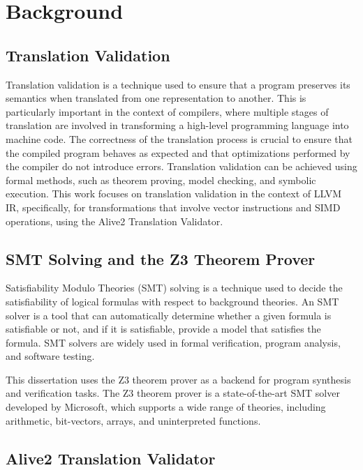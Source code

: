 \chapter{Background}
\label{chap:background}

\section {Translation Validation}

Translation validation is a technique used to ensure that a program
preserves its semantics when translated from one representation to
another.
%
This is particularly important in the context of compilers,
where multiple stages of translation are involved in transforming a
high-level programming language into machine code.
%
The correctness of the translation process is crucial to ensure that
the compiled program behaves as expected and that optimizations
performed by the compiler do not introduce errors.
%
Translation validation can be achieved using formal methods, such as
theorem proving, model checking, and symbolic execution.
%
This work focuses on translation validation in the context of
LLVM IR, specifically, for transformations that involve vector
instructions and SIMD operations, using the Alive2 Translation Validator.


\section {SMT Solving and the Z3 Theorem Prover}

Satisfiability Modulo Theories (SMT) solving is a technique used to
decide the satisfiability of logical formulas with respect to
background theories.
%
An SMT solver is a tool that can automatically
determine whether a given formula is satisfiable or not, and if it is
satisfiable, provide a model that satisfies the formula.
%
SMT solvers are widely used in formal verification, program analysis,
and software testing.

This dissertation uses the Z3 theorem prover as a backend for program
synthesis and verification tasks.
%
The Z3 theorem prover is a state-of-the-art SMT solver developed by
Microsoft, which supports a wide range of theories, including
arithmetic, bit-vectors, arrays, and uninterpreted functions.



\section {Alive2 Translation Validator}

